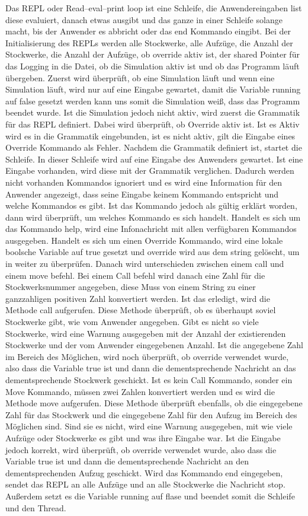 Das REPL oder Read–eval–print loop ist eine Schleife, die Anwendereingaben list diese evaluiert, danach etwas ausgibt und das ganze in einer Schleife solange macht, bis der Anwender es abbricht oder das end Kommando eingibt. Bei der Initialisierung des REPLs werden alle Stockwerke, alle Aufzüge, die Anzahl der Stockwerke, die Anzahl der Aufzüge, ob override aktiv ist, der shared Pointer für das Logging in die Datei, ob die Simulation aktiv ist und ob das Programm läuft übergeben. Zuerst wird überprüft, ob eine Simulation läuft und wenn eine Simulation läuft, wird nur auf eine Eingabe gewartet, damit die Variable running auf false gesetzt werden kann uns somit die Simulation weiß, dass das Programm beendet wurde. Ist die Simulation jedoch nicht aktiv, wird zuerst die Grammatik für das REPL definiert. Dabei wird überprüft, ob Override aktiv ist. Ist es Aktiv wird es in die Grammatik eingebunden, ist es nicht aktiv, gilt die Eingabe eines Override Kommando als Fehler. Nachdem die Grammatik definiert ist, startet die Schleife. In dieser Schleife wird auf eine Eingabe des Anwenders gewartet. Ist eine Eingabe vorhanden, wird diese mit der Grammatik verglichen. Dadurch werden nicht vorhanden Kommandos ignoriert und es wird eine Information für den Anwender angezeigt, dass seine Eingabe keinem Kommando entspricht und welche Kommandos es gibt. Ist das Kommando jedoch als gültig erklärt worden, dann wird überprüft, um welches Kommando es sich handelt. Handelt es sich um das Kommando help, wird eine Infonachricht mit allen verfügbaren Kommandos ausgegeben. Handelt es sich um einen Override Kommando, wird eine lokale boolsche Variable auf true gesetzt und override wird aus dem string gelöscht, um in weiter zu überprüfen. Danach wird unterschieden zwischen einem call und einem move befehl. Bei einem Call befehl wird danach eine Zahl für die Stockwerksnummer angegeben, diese Muss von einem String zu einer ganzzahligen positiven Zahl konvertiert werden. Ist das erledigt, wird die Methode call aufgerufen. Diese Methode überprüft, ob es überhaupt soviel Stockwerke gibt, wie vom Anwender angegeben. Gibt es nicht so viele Stockwerke, wird eine Warnung ausgegeben mit der Anzahl der existierenden Stockwerke und der vom Anwender eingegebenen Anzahl. Ist die angegebene Zahl im Bereich des Möglichen, wird noch überprüft, ob override verwendet wurde, also dass die Variable true ist und dann die dementsprechende Nachricht an das dementsprechende Stockwerk geschickt. Ist es kein Call Kommando, sonder ein Move Kommando, müssen zwei Zahlen konvertiert werden und es wird die Methode move aufgerufen. Diese Methode überprüft ebenfalls, ob die eingegebene Zahl für das Stockwerk und die eingegebene Zahl für den Aufzug im Bereich des Möglichen sind. Sind sie es nicht, wird eine Warnung ausgegeben, mit wie viele Aufzüge oder Stockwerke es gibt und was ihre Eingabe war. Ist die Eingabe jedoch korrekt, wird überprüft, ob override verwendet wurde, also dass die Variable true ist und dann die dementsprechende Nachricht an den dementsprechenden Aufzug geschickt. Wird das Kommando end eingegeben, sendet das REPL an alle Aufzüge und an alle Stockwerke die Nachricht stop. Außerdem setzt es die Variable running auf flase und beendet somit die Schleife und den Thread.